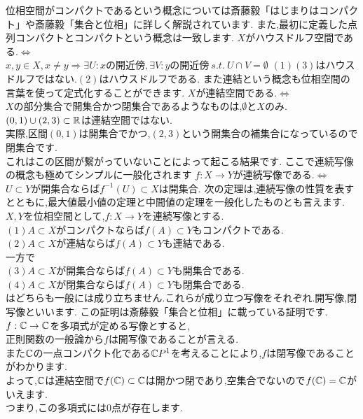 位相空間がコンパクトであるという概念については斎藤毅「はじまりはコンパクト」や斎藤毅「集合と位相」に詳しく解説されています.
また,最初に定義した点列コンパクトとコンパクトという概念は一致します.
$X$がハウスドルフ空間である.$\iff$\\
$x,y \in X , x\neq y \Rightarrow \exists U:x\mbox{の開近傍} ,\exists V:y\mbox{の開近傍} \ s.t. \ U \cap V = \emptyset$
\ex
$(1)(3)$はハウスドルフではない.$(2)$はハウスドルフである.
\exx
また連結という概念も位相空間の言葉を使って定式化することができます.
$X$が連結空間である.$\iff$\\
$X$の部分集合で開集合かつ閉集合であるようなものは,$\emptyset$と$X$のみ.
\ex
$(0,1) \cup (2,3)\subset\mathbb R$は連結空間ではない.\\
実際,区間$(0,1)$は開集合でかつ,$(2,3)$という開集合の補集合になっているので閉集合です.\\
これはこの区間が繋がっていないことによって起こる結果です.
\exx
ここで連続写像の概念も極めてシンプルに一般化されます
$f:X\to Y$が連続写像である.$\iff$\\
$U \subset Y$が開集合ならば$f^{-1}(U) \subset X$は開集合.
次の定理は,連続写像の性質を表すとともに,最大値最小値の定理と中間値の定理を一般化したものとも言えます.
\thm
$X,Y$を位相空間として,$f:X\to Y$を連続写像とする.\\
$(1)$$A\subset X$がコンパクトならば$f(A)\subset Y$もコンパクトである.\\
$(2)$$A\subset X$が連結ならば$f(A)\subset Y$も連結である.\\
\thmx
\rem
一方で\\
$(3)A\subset X$が開集合ならば$f(A)\subset Y$も開集合である.\\
$(4)A\subset X$が閉集合ならば$f(A)\subset Y$も閉集合である.\\
はどちらも一般には成り立ちません.これらが成り立つ写像をそれぞれ.開写像,閉写像といいます.
\remx
\proof[位相空間論における代数学の基本定理の証明]
この証明は斎藤毅「集合と位相」に載っている証明です.\\
$f:\mathbb C \to \mathbb C$を多項式が定める写像とすると,\\
正則関数の一般論から$f$は開写像であることが言える.\\
また$\mathbb C$の一点コンパクト化である$\mathbb C P^1$を考えることにより,$f$は閉写像であることがわかります.\\
よって,$\mathbb C$は連結空間で$f(\mathbb C)\subset\mathbb C$は開かつ閉であり,空集合でないので$f(\mathbb C)=\mathbb C$がいえます.\\
つまり,この多項式には$0$点が存在します.
\proofx
